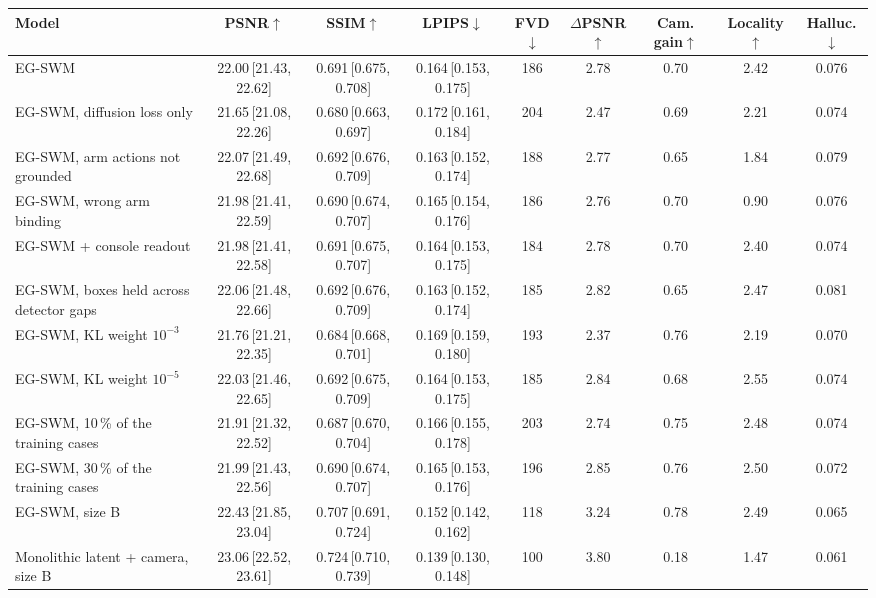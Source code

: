\begin{tabular}{lcccccccc}
\toprule
Model & PSNR$\uparrow$ & SSIM$\uparrow$ & LPIPS$\downarrow$ & FVD$\downarrow$ & $\Delta$PSNR$\uparrow$ & Cam. gain$\uparrow$ & Locality$\uparrow$ & Halluc.$\downarrow$ \\
\midrule
EG-SWM & 22.00\,{\scriptsize[21.43, 22.62]} & 0.691\,{\scriptsize[0.675, 0.708]} & 0.164\,{\scriptsize[0.153, 0.175]} & 186 & 2.78 & 0.70 & 2.42 & 0.076 \\
EG-SWM, diffusion loss only & 21.65\,{\scriptsize[21.08, 22.26]} & 0.680\,{\scriptsize[0.663, 0.697]} & 0.172\,{\scriptsize[0.161, 0.184]} & 204 & 2.47 & 0.69 & 2.21 & 0.074 \\
EG-SWM, arm actions not grounded & 22.07\,{\scriptsize[21.49, 22.68]} & 0.692\,{\scriptsize[0.676, 0.709]} & 0.163\,{\scriptsize[0.152, 0.174]} & 188 & 2.77 & 0.65 & 1.84 & 0.079 \\
EG-SWM, wrong arm binding & 21.98\,{\scriptsize[21.41, 22.59]} & 0.690\,{\scriptsize[0.674, 0.707]} & 0.165\,{\scriptsize[0.154, 0.176]} & 186 & 2.76 & 0.70 & 0.90 & 0.076 \\
EG-SWM + console readout & 21.98\,{\scriptsize[21.41, 22.58]} & 0.691\,{\scriptsize[0.675, 0.707]} & 0.164\,{\scriptsize[0.153, 0.175]} & 184 & 2.78 & 0.70 & 2.40 & 0.074 \\
EG-SWM, boxes held across detector gaps & 22.06\,{\scriptsize[21.48, 22.66]} & 0.692\,{\scriptsize[0.676, 0.709]} & 0.163\,{\scriptsize[0.152, 0.174]} & 185 & 2.82 & 0.65 & 2.47 & 0.081 \\
EG-SWM, KL weight $10^{-3}$ & 21.76\,{\scriptsize[21.21, 22.35]} & 0.684\,{\scriptsize[0.668, 0.701]} & 0.169\,{\scriptsize[0.159, 0.180]} & 193 & 2.37 & 0.76 & 2.19 & 0.070 \\
EG-SWM, KL weight $10^{-5}$ & 22.03\,{\scriptsize[21.46, 22.65]} & 0.692\,{\scriptsize[0.675, 0.709]} & 0.164\,{\scriptsize[0.153, 0.175]} & 185 & 2.84 & 0.68 & 2.55 & 0.074 \\
EG-SWM, 10\,\% of the training cases & 21.91\,{\scriptsize[21.32, 22.52]} & 0.687\,{\scriptsize[0.670, 0.704]} & 0.166\,{\scriptsize[0.155, 0.178]} & 203 & 2.74 & 0.75 & 2.48 & 0.074 \\
EG-SWM, 30\,\% of the training cases & 21.99\,{\scriptsize[21.43, 22.56]} & 0.690\,{\scriptsize[0.674, 0.707]} & 0.165\,{\scriptsize[0.153, 0.176]} & 196 & 2.85 & 0.76 & 2.50 & 0.072 \\
EG-SWM, size B & 22.43\,{\scriptsize[21.85, 23.04]} & 0.707\,{\scriptsize[0.691, 0.724]} & 0.152\,{\scriptsize[0.142, 0.162]} & 118 & 3.24 & 0.78 & 2.49 & 0.065 \\
Monolithic latent + camera, size B & 23.06\,{\scriptsize[22.52, 23.61]} & 0.724\,{\scriptsize[0.710, 0.739]} & 0.139\,{\scriptsize[0.130, 0.148]} & 100 & 3.80 & 0.18 & 1.47 & 0.061 \\
\bottomrule
\end{tabular}
